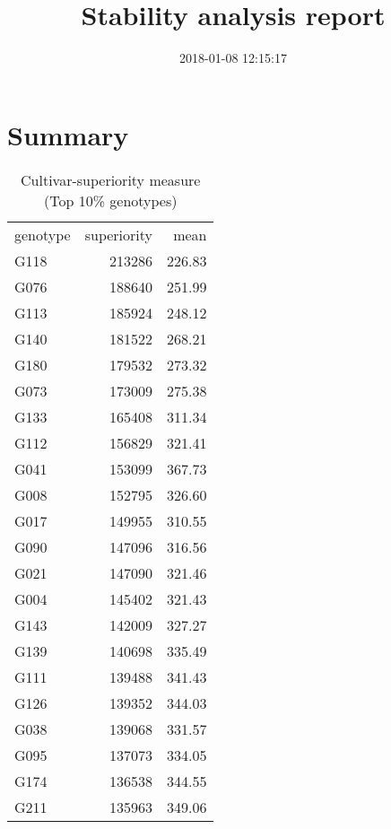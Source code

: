 \documentclass[a4paper,11pt]{article}\usepackage[]{graphicx}\usepackage[]{color}
\title{Stability analysis report}%
\author{\vspace{-5ex}}
\date{2018-01-08 12:15:17}
\begin{document}


\maketitle
\singlespacing

\section{Summary}
\begin{table}[ht]
\begin{flushleft}
\caption{Cultivar-superiority measure (Top 10\% genotypes)} 
\label{cultSup}
\begin{tabular}{lrr}
 genotype & superiority & mean \\ 
 G118 & 213286 & 226.83 \\ 
  G076 & 188640 & 251.99 \\ 
  G113 & 185924 & 248.12 \\ 
  G140 & 181522 & 268.21 \\ 
  G180 & 179532 & 273.32 \\ 
  G073 & 173009 & 275.38 \\ 
  G133 & 165408 & 311.34 \\ 
  G112 & 156829 & 321.41 \\ 
  G041 & 153099 & 367.73 \\ 
  G008 & 152795 & 326.60 \\ 
  G017 & 149955 & 310.55 \\ 
  G090 & 147096 & 316.56 \\ 
  G021 & 147090 & 321.46 \\ 
  G004 & 145402 & 321.43 \\ 
  G143 & 142009 & 327.27 \\ 
  G139 & 140698 & 335.49 \\ 
  G111 & 139488 & 341.43 \\ 
  G126 & 139352 & 344.03 \\ 
  G038 & 139068 & 331.57 \\ 
  G095 & 137073 & 334.05 \\ 
  G174 & 136538 & 344.55 \\ 
  G211 & 135963 & 349.06 \\ 
  \end{tabular}
\end{flushleft}
\end{table}
\end{document}
